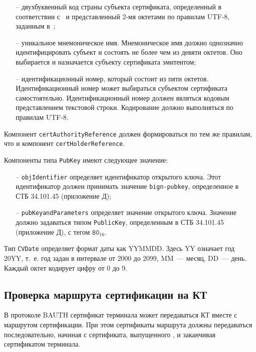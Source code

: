 \begin{itemize}
\item[--]
двухбуквенный код страны субъекта сертификата, определенный в 
соответствии с~\cite{CountryCodes} и представленный 2-мя октетами 
по правилам UTF-8, заданным в~\cite{UTF8}; 

\item[--]
уникальное мнемоническое имя. Мнемоническое имя должно однозначно 
идентифицировать субъект и состоять не более чем из девяти октетов. Оно 
выбирается и назначается субъекту сертификата эмитентом; 

\item[--]
идентификационный номер, который состоит из пяти октетов. 
Идентификационный номер может выбираться субъектом сертификата 
самостоятельно. Идентификационный номер должен являться кодовым 
представлением текстовой строки. Кодирование должно выполняться по 
правилам UTF-8. 
\end{itemize}

Компонент \verb|certAuthorityReference| должен формироваться по тем же 
правилам, что и компонент \verb|certHolderReference|. 

Компоненты типа \verb|PubKey| имеют следующее значение:

\begin{itemize}
\item[--]
\verb|objIdentifier| определяет идентификатор открытого ключа. 
Этот идентификатор должен принимать значение \texttt{bign-pubkey}, 
определенное в СТБ 34.101.45 (приложение Д); 

\item[--]
\verb|pubKeyandParameters| определяет значение открытого ключа. 
Значение должно задаваться типом \verb|PublicKey|, 
определенным в СТБ 34.101.45 (приложение Д), с тегом $\texttt{80}_{16}$. 
\end{itemize}

Тип \verb|CVDate| определяет формат даты как YYMMDD. Здесь YY означает год 20YY, 
т.~е. год задан в интервале от 2000 до 2099, MM~--- месяц, DD~--- день. 
Каждый октет кодирует цифру от 0 до 9. 

\subsection{Проверка маршрута сертификации на КТ}\label{CERTS.Path}

В протоколе BAUTH сертификат терминала может передаваться КТ вместе с маршрутом 
сертификации. При этом сертификаты маршрута должны передаваться 
последовательно, начиная с сертификата, выпущенного , и заканчивая 
сертификатом терминала. 

